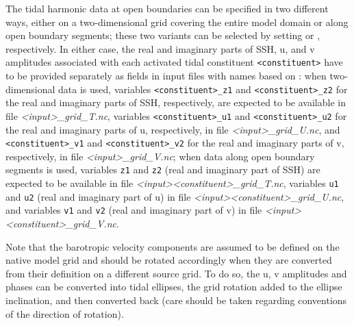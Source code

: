 \documentclass[../main/NEMO_manual]{subfiles}
\begin{document}
The tidal harmonic data at open boundaries can be specified in two
different ways, either on a two-dimensional grid covering the entire
model domain or along open boundary segments; these two variants can
be selected by setting  or
, respectively. In either
case, the real and imaginary parts of SSH, u, and v amplitudes associated with
each activated tidal constituent \texttt{<constituent>} have to be provided
separately as fields in input files with names based on
: when two-dimensional data is used, variables
\texttt{<constituent>\_z1} and \texttt{<constituent>\_z2} for the real and imaginary parts of
SSH, respectively, are expected to be available in file
\textit{<input>\_grid\_T.nc}, variables \texttt{<constituent>\_u1} and
\texttt{<constituent>\_u2} for the real and imaginary parts of u, respectively, in file
\textit{<input>\_grid\_U.nc}, and \texttt{<constituent>\_v1} and
\texttt{<constituent>\_v2} for the real and imaginary parts of v, respectively, in file
\textit{<input>\_grid\_V.nc}; when data along open boundary segments is used,
variables \texttt{z1} and \texttt{z2} (real and imaginary part of SSH) are
expected to be available in file \textit{<input><constituent>\_grid\_T.nc},
variables \texttt{u1} and \texttt{u2} (real and imaginary part of u) in file
\textit{<input><constituent>\_grid\_U.nc}, and variables \texttt{v1} and \texttt{v2}
(real and imaginary part of v) in file
\textit{<input><constituent>\_grid\_V.nc}.\par

Note that the barotropic velocity components are assumed to be defined
on the native model grid and should be rotated accordingly when they
are converted from their definition on a different source grid. To do
so, the u, v amplitudes and phases can be converted into tidal
ellipses, the grid rotation added to the ellipse inclination, and then
converted back (care should be taken regarding conventions of the
direction of rotation). %

\subinc{}
\end{document}
